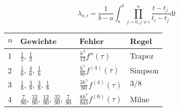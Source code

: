 \vspace*{-2mm}
$$\lambda_{n,i} = \frac{1}{b-a} \int_a^b \prod_{j=0,j\neq i}^n \frac{t-t_j}{t_i-t_j} \text{d}t$$

{\def\arraystretch{1.6}
\begin{tabular}{ l | l | l | l }
$n$ & Gewichte & Fehler & Regel \\
\hline
1 & $\frac{1}{2}$, $\frac{1}{2}$ & $\frac{h^3}{12}f''(\tau)$ & Trapez \\
2 & $\frac{1}{6}$, $\frac{4}{6}$, $\frac{1}{6}$ & $\frac{h^5}{90}f^{(4)}(\tau)$ & Simpson \\
3 & $\frac{1}{8}$, $\frac{3}{8}$, $\frac{3}{8}$, $\frac{1}{8}$ & $\frac{3h^5}{80}f^{(4)}(\tau)$ & $3/8$ \\
4 & $\frac{7}{90}$, $\frac{32}{90}$, $\frac{12}{90}$, $\frac{32}{90}$, $\frac{7}{90}$ & $\frac{8h^7}{945}f^{(6)}(\tau)$ & Milne
\end{tabular}
}
